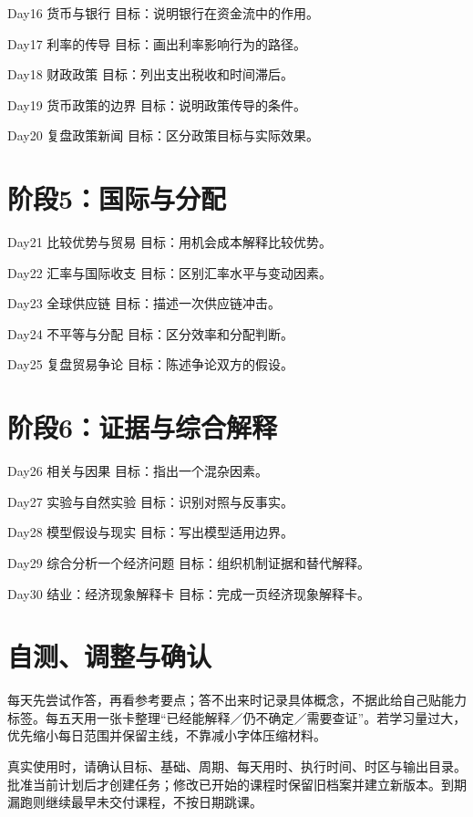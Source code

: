 \documentclass[11pt]{article}
\newcommand{\Needspace}[1]{\par\ifdim\dimexpr\pagegoal-\pagetotal\relax<#1\relax\newpage\fi}
\begin{document}
Day16  货币与银行
目标：说明银行在资金流中的作用。

Day17  利率的传导
目标：画出利率影响行为的路径。

Day18  财政政策
目标：列出支出税收和时间滞后。

Day19  货币政策的边界
目标：说明政策传导的条件。

Day20  复盘政策新闻
目标：区分政策目标与实际效果。

\Needspace{5\baselineskip}\section*{阶段5：国际与分配}

Day21  比较优势与贸易
目标：用机会成本解释比较优势。

Day22  汇率与国际收支
目标：区别汇率水平与变动因素。

Day23  全球供应链
目标：描述一次供应链冲击。

Day24  不平等与分配
目标：区分效率和分配判断。

Day25  复盘贸易争论
目标：陈述争论双方的假设。

\Needspace{5\baselineskip}\section*{阶段6：证据与综合解释}

Day26  相关与因果
目标：指出一个混杂因素。

Day27  实验与自然实验
目标：识别对照与反事实。

Day28  模型假设与现实
目标：写出模型适用边界。

Day29  综合分析一个经济问题
目标：组织机制证据和替代解释。

Day30  结业：经济现象解释卡
目标：完成一页经济现象解释卡。

\Needspace{5\baselineskip}\section*{自测、调整与确认}

每天先尝试作答，再看参考要点；答不出来时记录具体概念，不据此给自己贴能力标签。每五天用一张卡整理“已经能解释／仍不确定／需要查证”。若学习量过大，优先缩小每日范围并保留主线，不靠减小字体压缩材料。

真实使用时，请确认目标、基础、周期、每天用时、执行时间、时区与输出目录。批准当前计划后才创建任务；修改已开始的课程时保留旧档案并建立新版本。到期漏跑则继续最早未交付课程，不按日期跳课。
\end{document}
